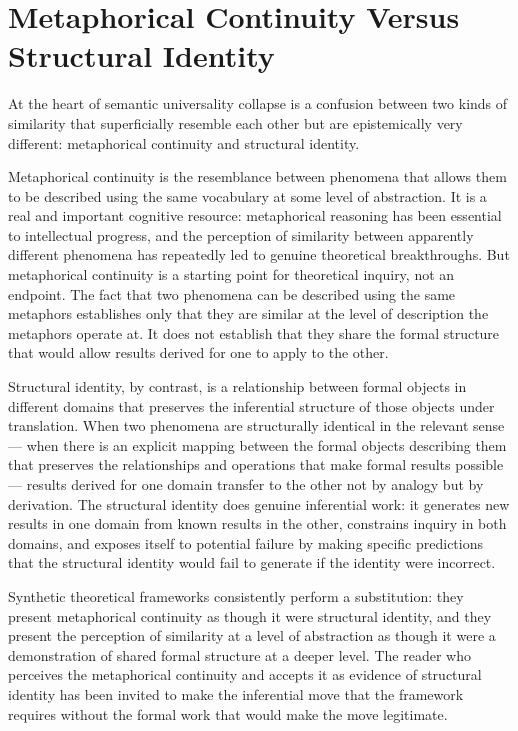 \documentclass[12pt, openright, twoside]{book}
\begin{document}
\section{Metaphorical Continuity Versus Structural Identity}

At the heart of semantic universality collapse
is a confusion between two kinds of similarity
that superficially resemble each other but are
epistemically very different: metaphorical
continuity and structural identity.

Metaphorical continuity is the resemblance between
phenomena that allows them to be described using
the same vocabulary at some level of abstraction.
It is a real and important cognitive resource:
metaphorical reasoning has been essential to
intellectual progress, and the perception of
similarity between apparently different phenomena
has repeatedly led to genuine theoretical
breakthroughs. But metaphorical continuity is
a starting point for theoretical inquiry, not
an endpoint. The fact that two phenomena can
be described using the same metaphors establishes
only that they are similar at the level of
description the metaphors operate at. It does
not establish that they share the formal structure
that would allow results derived for one to
apply to the other.

Structural identity, by contrast, is a relationship
between formal objects in different domains that
preserves the inferential structure of those objects
under translation. When two phenomena are structurally
identical in the relevant sense --- when there is
an explicit mapping between the formal objects
describing them that preserves the relationships
and operations that make formal results possible
--- results derived for one domain transfer to
the other not by analogy but by derivation. The
structural identity does genuine inferential work:
it generates new results in one domain from known
results in the other, constrains inquiry in both
domains, and exposes itself to potential failure
by making specific predictions that the structural
identity would fail to generate if the identity
were incorrect.

Synthetic theoretical frameworks consistently
perform a substitution: they present metaphorical
continuity as though it were structural identity,
and they present the perception of similarity
at a level of abstraction as though it were
a demonstration of shared formal structure at
a deeper level. The reader who perceives the
metaphorical continuity and accepts it as
evidence of structural identity has been invited
to make the inferential move that the framework
requires without the formal work that would
make the move legitimate.
\end{document}
